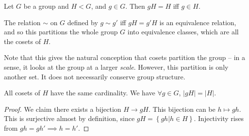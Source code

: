 \begin{corollary}
  Let $G$ be a group and $H< G$, and $g\in G$. Then $gH=H$ iff $g\in H$.
\end{corollary}

\begin{corollary}
  The relation $\sim$ on $G$ defined by $g\sim g'$ iff $gH=g'H$ is an equivalence
  relation, and so this partitions the whole group $G$ into equivalence classes, which
  are all the cosets of $H$.
  \label{leftCosetsEqRel}
\end{corollary}

\begin{remark}
  Note that this gives the natural conception that cosets partition the group -- in a sense, it
  looks at the group at a larger \emph{scale}. However, this partition is only another
  set. It does not necessarily conserve group structure.
\end{remark}


\begin{theorem}
  All cosets of $H$ have the same cardinality. We have $\forall g\in G$, $|gH|=|H|$.
  \label{cosetsCardinality}
\end{theorem}
\begin{proof}
  We claim there exists a bijection $H\to gH$. This bijection can be $h\mapsto gh$.
  This is surjective almost by definition, since $gH=\left\{ gh | h\in H \right\}$.
  Injectivity rises from $gh=gh'\implies h=h'$.
\end{proof}
